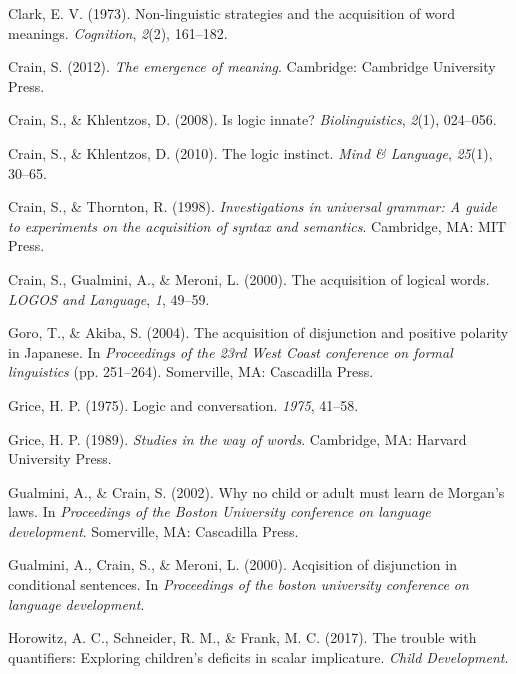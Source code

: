 \documentclass[floatsintext,man]{apa6}
\theoremstyle{definition}
\theoremstyle{definition}
\theoremstyle{definition}
\theoremstyle{remark}
\begin{document}
\hypertarget{ref-clark1973non}{}
Clark, E. V. (1973). Non-linguistic strategies and the acquisition of
word meanings. \emph{Cognition}, \emph{2}(2), 161--182.

\hypertarget{ref-crain2012emergence}{}
Crain, S. (2012). \emph{The emergence of meaning}. Cambridge: Cambridge
University Press.

\hypertarget{ref-crain2008logic}{}
Crain, S., \& Khlentzos, D. (2008). Is logic innate?
\emph{Biolinguistics}, \emph{2}(1), 024--056.

\hypertarget{ref-crain2010logic}{}
Crain, S., \& Khlentzos, D. (2010). The logic instinct. \emph{Mind \&
Language}, \emph{25}(1), 30--65.

\hypertarget{ref-crain1998investigations}{}
Crain, S., \& Thornton, R. (1998). \emph{Investigations in universal
grammar: A guide to experiments on the acquisition of syntax and
semantics}. Cambridge, MA: MIT Press.

\hypertarget{ref-crain2000acquisition}{}
Crain, S., Gualmini, A., \& Meroni, L. (2000). The acquisition of
logical words. \emph{LOGOS and Language}, \emph{1}, 49--59.

\hypertarget{ref-goro2004acquisition}{}
Goro, T., \& Akiba, S. (2004). The acquisition of disjunction and
positive polarity in Japanese. In \emph{Proceedings of the 23rd West
Coast conference on formal linguistics} (pp. 251--264). Somerville, MA:
Cascadilla Press.

\hypertarget{ref-grice1975logic}{}
Grice, H. P. (1975). Logic and conversation. \emph{1975}, 41--58.

\hypertarget{ref-grice1989studies}{}
Grice, H. P. (1989). \emph{Studies in the way of words}. Cambridge, MA:
Harvard University Press.

\hypertarget{ref-gualminicrain2002}{}
Gualmini, A., \& Crain, S. (2002). Why no child or adult must learn de
Morgan's laws. In \emph{Proceedings of the Boston University conference
on language development}. Somerville, MA: Cascadilla Press.

\hypertarget{ref-gualmini2000}{}
Gualmini, A., Crain, S., \& Meroni, L. (2000). Acqisition of disjunction
in conditional sentences. In \emph{Proceedings of the boston university
conference on language development}.

\hypertarget{ref-horowitz2017trouble}{}
Horowitz, A. C., Schneider, R. M., \& Frank, M. C. (2017). The trouble
with quantifiers: Exploring children's deficits in scalar implicature.
\emph{Child Development}.
\end{document}
